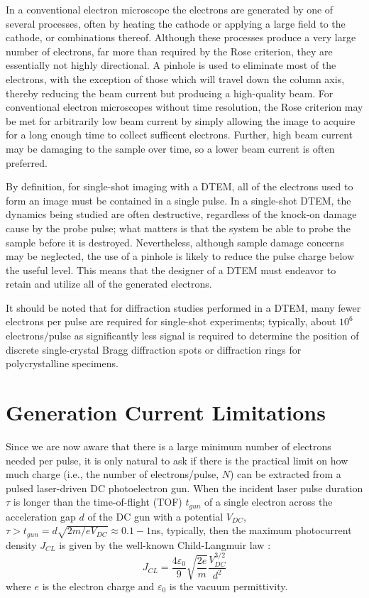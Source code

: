 In a conventional electron microscope the electrons are generated by one of several processes, often by heating the cathode or applying a large field to the cathode, or combinations thereof.
Although these processes produce a very large number of electrons, far more than required by the Rose criterion, they are essentially not highly directional.
A pinhole is used to eliminate most of the electrons, with the exception of those which will travel down the column axis, thereby reducing the beam current but producing a high-quality beam.
For conventional electron microscopes without time resolution, the Rose criterion may be met for arbitrarily low beam current by simply allowing the image to acquire for a long enough time to collect sufficent electrons.
Further, high beam current may be damaging to the sample over time, so a lower beam current is often preferred.

By definition, for single-shot imaging with a DTEM, all of the electrons used to form an image must be contained in a single pulse.
In a single-shot DTEM, the dynamics being studied are often destructive, regardless of the knock-on damage cause by the probe pulse; what matters is that the system be able to probe the sample before it is destroyed.
Nevertheless, although sample damage concerns may be neglected, the use of a pinhole is likely to reduce the pulse charge below the useful level.
This means that the designer of a DTEM must endeavor to retain and utilize all of the generated electrons.

It should be noted that for diffraction studies performed in a DTEM, many fewer electrons per pulse are required for single-shot experiments; typically, about $10^6$ electrons/pulse \cite{armstrong_practical_2007} as significantly less signal is required to determine the position of discrete single-crystal Bragg diffraction spots or diffraction rings for polycrystalline specimens.

\section{Generation Current Limitations} \label{sec:childs_law}

Since we are now aware that there is a large minimum number of electrons needed per pulse, it is only natural to ask if there is the practical limit on how much charge (i.e., the number of electrons/pulse, $N$) can be extracted from a pulsed laser-driven DC photoelectron gun.
When the incident laser pulse duration $\tau$ is longer than the time-of-flight (TOF) $t_{gun}$ of a single electron across the acceleration gap $d$ of the DC gun with a potential $V_{DC}$, $\tau > t_{gun} = d \sqrt{2m/eV_{DC}} \approx 0.1-1$ns, typically, then the maximum photocurrent density $J_{CL}$ is given by the well-known Child-Langmuir law \cite{child_discharge_1911,langmuir_effect_1923}:
\begin{equation}
  J_{CL} = \frac{4 \varepsilon_0}{9} \sqrt{\frac{2e}{m}} \frac{V_{DC}^{3/2}}{d^2}
\end{equation}
where $e$ is the electron charge and $\varepsilon_0$ is the vacuum permittivity.

